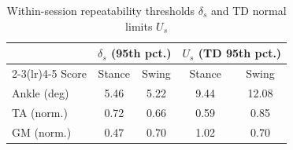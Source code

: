 \documentclass[conference]{IEEEtran}
\begin{document}
\begin{table}[t]
\centering
\caption{Within-session repeatability thresholds $\delta_s$ and TD normal limits $U_s$}
\label{tab:thr}
\footnotesize
\begin{tabular}{lcccc}
\toprule
 & \multicolumn{2}{c}{$\delta_s$ (95th pct.)} & \multicolumn{2}{c}{$U_s$ (TD 95th pct.)} \\
\cmidrule(lr){2-3}\cmidrule(lr){4-5}
Score & Stance & Swing & Stance & Swing \\
\midrule
Ankle (deg) & 5.46 & 5.22 & 9.44 & 12.08 \\
TA (norm.)  & 0.72 & 0.66 & 0.59 & 0.85 \\
GM (norm.)  & 0.47 & 0.70 & 1.02 & 0.70 \\
\bottomrule
\end{tabular}
\end{table}
\end{document}

